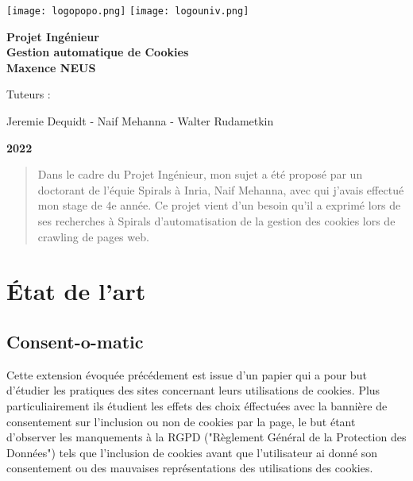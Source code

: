 \documentclass[oneside,a4paper,12pt]{article}
\begin{document}
	\begin{titlepage}
		\texttt{[image: logopopo.png]}
		\hspace*{\fill}
		\texttt{[image: logouniv.png]}
		
		\begin{center}
			\vspace{1cm}
			\textbf{Projet Ingénieur}\\
			\vspace{1cm}
			\textbf{\LARGE Gestion automatique de Cookies}\\
			\vspace{1cm}
			\textbf{Maxence NEUS}\\
			\vspace{1cm}
			
			\vspace{2cm}
			\vspace{\fill}
			\small Tuteurs :
			
			Jeremie Dequidt - Naif Mehanna - Walter Rudametkin
			
			\normalsize
			\vspace{2em}
			\textbf{2022}\\
		\end{center}
	\end{titlepage}
	
	\tableofcontents
	\vfill
	\begin{abstract}
		Dans le cadre du Projet Ingénieur, mon sujet a été proposé par un doctorant de l'équie Spirals à Inria, Naif Mehanna, avec qui j'avais effectué mon stage de 4e année. 
		Ce projet vient d'un besoin qu'il a exprimé lors de ses recherches à Spirals d'automatisation de la gestion des cookies lors de crawling de pages web.
	\end{abstract}
	
	
	
	\section{\'Etat de l'art}
	
	\subsection{Consent-o-matic}
	Cette extension évoquée précédement est issue d'un papier \cite{consentomatic} qui a pour but d'étudier les pratiques des sites concernant leurs utilisations de cookies.
	Plus particuliairement ils étudient les effets des choix éffectuées avec la bannière de consentement sur l'inclusion ou non de cookies par la page, le but étant d'observer les manquements à la RGPD ("Règlement Général de la Protection des Données") tels que l'inclusion de cookies avant que l'utilisateur ai donné son consentement ou des mauvaises représentations des utilisations des cookies.
	
\end{document}

